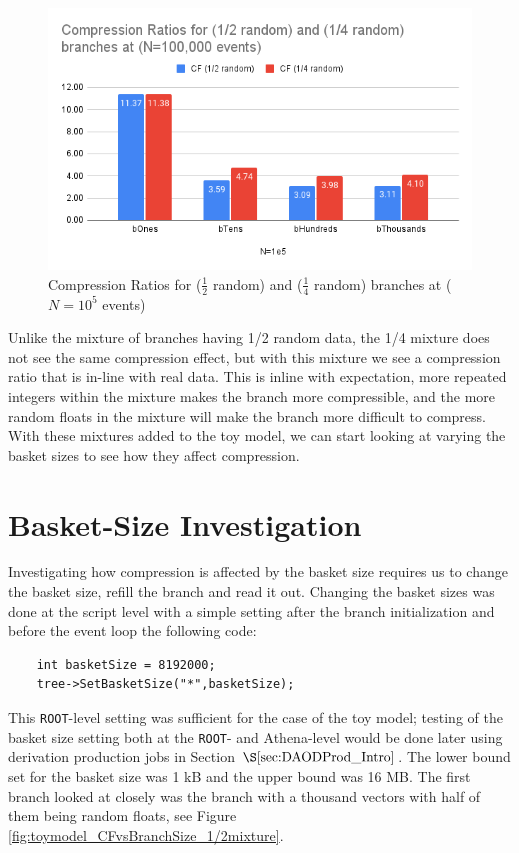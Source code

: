 \begin{figure}[h]
    \centering
    \includegraphics[width=.8\textwidth]{content/toymodel_content/Compression Ratios for (1_2 random) and (1_4 random) branches at (N=100,000 events).png}
    \caption{Compression Ratios for ($\frac{1}{2}$ random) and ($\frac{1}{4}$ random) branches at ($N=10^5$ events)}
    \label{fig:toymodel_compF_1e5_mix_random}
\end{figure}

Unlike the mixture of branches having 1/2 random data, the 1/4 mixture does not see the same compression effect, but with this mixture we see a compression ratio that is in-line with real data.
This is inline with expectation, more repeated integers within the mixture makes the branch more compressible, and the more random floats in the mixture will make the branch more difficult to compress.
With these mixtures added to the toy model, we can start looking at varying the basket sizes to see how they affect compression.

\section{Basket-Size Investigation}
\label{sec: toy-model basket-size investigation}

Investigating how compression is affected by the basket size requires us to change the basket size, refill the branch and read it out.
Changing the basket sizes was done at the script level with a simple setting after the branch initialization and before the event loop the following code:
\begin{lstlisting}
    int basketSize = 8192000;
    tree->SetBasketSize("*",basketSize);
\end{lstlisting}
This \verb|ROOT|-level setting was sufficient for the case of the toy model; testing of the basket size setting both at the \verb|ROOT|- and Athena-level would be done later using derivation production jobs in Section $\S\ref{sec:DAODProd_Intro}$.
The lower bound set for the basket size was 1 kB and the upper bound was 16 MB.
The first branch looked at closely was the branch with a thousand vectors with half of them being random floats, see Figure \ref{fig:toymodel_CFvsBranchSize_1/2mixture}.

